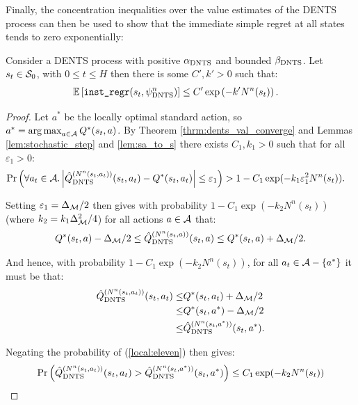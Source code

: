     Finally, the concentration inequalities over the value estimates of the DENTS process can then be used to show that the immediate simple regret at all states tends to zero exponentially: 
    \begin{lemma} \label{lem:dents_imm_simple_regret}
        Consider a DENTS process with positive ${\alpha_{{\textnormal{DNTS}}}}$ and bounded ${\beta_{{\textnormal{DNTS}}}}$. Let $s_t\in\mathcal{S}_0$, with $0\leq t \leq H$ then there is some $C',k'>0$ such that:
        \begin{align}
            \mathbb{E} \left[ {\textnormal{\texttt{inst\_regr}}}(s_{t},{\psi^{n}_{{\textnormal{DNTS}}}}) \right] &\leq C'\exp\left( -k' N^n(s_{t}) \right).
        \end{align}
    \end{lemma}
    \begin{proof}
        Let $a^*$ be the locally optimal standard action, so $a^*=\operatorname*{arg\,max}_{a\in\mathcal{A}} Q^*(s_t,a)$. By Theorem \ref{thrm:dents_val_converge} and Lemmas \ref{lem:stochastic_step} and \ref{lem:sa_to_s} there exists $C_1,k_1>0$ such that for all $\varepsilon_1>0$:
        \begin{align}
            \Pr\left(\forall a_t\in\mathcal{A}. \left|{\hat{Q}^{(N^n(s_t,a_t))}_{{\textnormal{DNTS}}}}(s_t,a_t)-Q^*(s_t,a_t)\right|\leq \varepsilon_1\right) &> 1-C_1 \exp(-k_1 \varepsilon_1^2 N^n(s_t)).
        \end{align}
        
        Setting $\varepsilon_1=\Delta_{\mathcal{M}}/2$ then gives with probability $1-C_1 \exp(-k_2N^n(s_t))$ (where $k_2=k_1\Delta_{\mathcal{M}}^2/4$) for all actions $a\in\mathcal{A}$ that:
        \begin{align}
            Q^*(s_t,a) - \Delta_{\mathcal{M}}/2 \leq {\hat{Q}^{(N^n(s_t,a))}_{{\textnormal{DNTS}}}}(s_t,a) \leq Q^*(s_t,a) + \Delta_{\mathcal{M}}/2.
        \end{align}
        
        And hence, with probability $1-C_1 \exp(-k_2N^n(s_t))$, for all $a_t\in\mathcal{A}-\{a^*\}$ it must be that:
        \begin{align}
            {\hat{Q}^{(N^n(s_t,a_t))}_{{\textnormal{DNTS}}}}(s_t,a_t)
                \leq& Q^*(s_t,a_t) + \Delta_{\mathcal{M}}/2 \\
                \leq& Q^*(s_t,a^*) - \Delta_{\mathcal{M}}/2 \\
                \leq& {\hat{Q}^{(N^n(s_t,a^*))}_{{\textnormal{DNTS}}}}(s_t,a^*). \label{local:eleven}
        \end{align}
        
        Negating the probability of (\ref{local:eleven}) then gives:
        \begin{align}
            \Pr\left({\hat{Q}^{(N^n(s_t,a_t))}_{{\textnormal{DNTS}}}}(s_t,a_t) > {\hat{Q}^{(N^n(s_t,a^*))}_{{\textnormal{DNTS}}}}(s_t,a^*)\right) \leq C_1 \exp(-k_2N^n(s_t))
        \end{align}
        

\end{proof}
